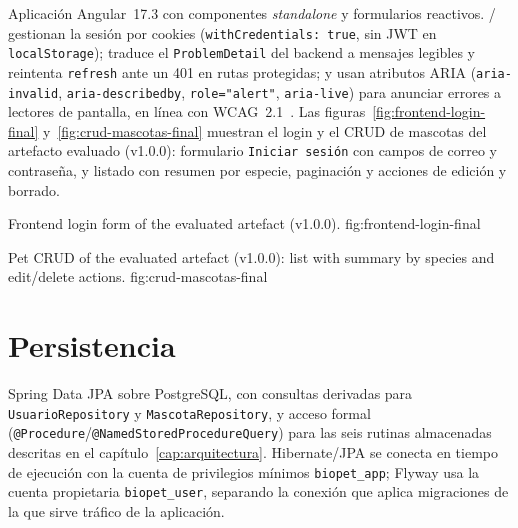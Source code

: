 Aplicaci\'on Angular~17.3 con componentes \emph{standalone} y formularios
reactivos. / gestionan
la sesi\'on por cookies (\texttt{withCredentials: true}, sin JWT en
\texttt{localStorage});  traduce el
\texttt{ProblemDetail} del backend a mensajes legibles y reintenta
\texttt{refresh} ante un 401 en rutas protegidas; 
y  usan atributos ARIA
(\texttt{aria-invalid}, \texttt{aria-describedby}, \texttt{role="alert"},
\texttt{aria-live}) para anunciar errores a lectores de pantalla, en
l\'inea con WCAG~2.1~\cite{wcag21}. Las figuras~\ref{fig:frontend-login-final}
y~\ref{fig:crud-mascotas-final} muestran el login y el CRUD de mascotas
del artefacto evaluado (v1.0.0): formulario \texttt{Iniciar sesi\'on} con
campos de correo y contrase\~na, y listado con resumen por especie,
paginaci\'on y acciones de edici\'on y borrado.

%
{Frontend login form of the evaluated artefact (v1.0.0).}%
{fig:frontend-login-final}

%
{Pet CRUD of the evaluated artefact (v1.0.0): list with summary by species and edit/delete actions.}%
{fig:crud-mascotas-final}

\section{Persistencia}

Spring Data JPA sobre PostgreSQL, con consultas derivadas para
\texttt{UsuarioRepository} y \texttt{MascotaRepository}, y acceso formal
(\texttt{@Procedure}/\texttt{@NamedStoredProcedureQuery}) para las seis
rutinas almacenadas descritas en el cap\'itulo~\ref{cap:arquitectura}.
Hibernate/JPA se conecta en tiempo de ejecuci\'on con la cuenta de
privilegios m\'inimos \texttt{biopet\_app}; Flyway usa la cuenta propietaria
\texttt{biopet\_user}, separando la conexi\'on que aplica migraciones de la
que sirve tr\'afico de la aplicaci\'on.

